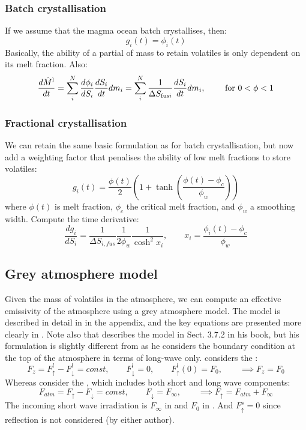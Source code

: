 \subsubsection{Batch crystallisation}
If we assume that the magma ocean batch crystallises, then:
\begin{equation}
g_i(t) = \phi_i(t)
\end{equation}
Basically, the ability of a partial of mass to retain volatiles is only dependent on its melt fraction.  Also:
\begin{equation}
\frac{d \hat{M}^{\rm l}}{dt} = \sum_i^N \frac{d \phi_i}{d S_i} \frac{dS_i}{dt} dm_i = \sum_i^N \frac{1}{\Delta S_{{\rm fus}i}} \frac{dS_i}{dt} dm_i, \qquad \text{ for } 0 < \phi < 1
\end{equation}
\subsubsection{Fractional crystallisation}
We can retain the same basic formulation as for batch crystallisation, but now add a weighting factor that penalises the ability of low melt fractions to store volatiles:
\begin{equation}
g_i(t) = \frac{\phi(t)}{2} \left(1+ \tanh\left(\frac{\phi(t)-\phi_c}{\phi_w} \right)\right)
\end{equation}
where $\phi(t)$ is melt fraction, $\phi_c$ the critical melt fraction, and $\phi_w$ a smoothing width.  Compute the time derivative:
\begin{equation}
\frac{d g_i}{d S_i} =\frac{1}{\Delta S_{i,fus}} \frac{1}{2\phi_w} \frac{1}{\cosh^2{x_i}}, \qquad x_i = \frac{\phi_i(t)-\phi_c}{\phi_w}
\end{equation}
\subsection{Grey atmosphere model}
Given the mass of volatiles in the atmosphere, we can compute an effective emissivity of the atmosphere using a grey atmosphere model.  The model is described in detail in \cite{AM85} in the appendix, and the key equations are presented more clearly in \cite{ET08}.  Note also that \cite{AND10} describes the model in Sect. 3.7.2 in his book, but his formulation is slightly different from \cite{AM85} as he considers the boundary condition at the top of the atmosphere in terms of long-wave only.  \cite{AND10} considers the :
\begin{equation}
F_z = F_{\uparrow}^l - F_{\downarrow}^l = const, \qquad F_{\downarrow}^l=0, \qquad F_\uparrow^l(0)=F_0, \qquad \implies F_z=F_0
\end{equation}
Whereas \cite{AM85} consider the , which includes both short and long wave components:
\begin{equation}
F_{atm} = F_{\uparrow} - F_{\downarrow} = const, \qquad F_{\downarrow}=F_\infty, \qquad \implies F_{\uparrow} = F_{atm} + F_\infty
\end{equation}
The incoming short wave irradiation is $F_\infty$ in \cite{AM85} and $F_0$ in \cite{AND10}.  And $F_{\uparrow}^s=0$ since reflection is not considered (by either author).

